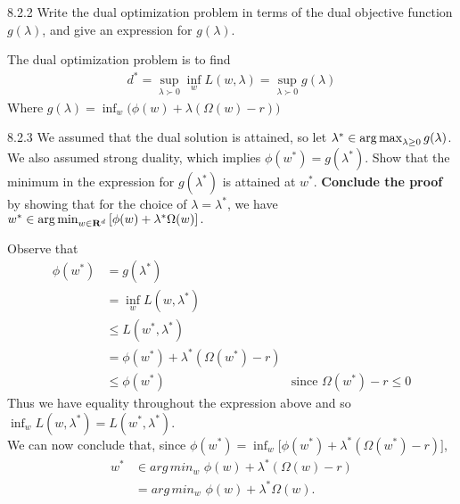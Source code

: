 \documentclass[12pt,letterpaper]{article}
\begin{document}
\begin{problem}{8.2.2}
Write the dual optimization problem in terms of the
dual objective function $g(\lambda)$, and give an expression for
$g(\lambda)$.
\end{problem}
\begin{solution}{}
    The dual optimization problem is to find
    \begin{align*}
        d^*= \sup_{\lambda\succ 0} \inf_w L(w,\lambda) = \sup_{\lambda\succ 0} g(\lambda)
    \end{align*}
    Where $g(\lambda) = \inf_w\big(\phi(w)+\lambda(\Omega(w)-r)\big)$
\end{solution}
\newpage

\begin{problem}{8.2.3}
We assumed that the dual solution is attained, so let
$\lambda^{*}\in\argmax_{\lambda\ge0}g(\lambda)$. We also assumed
strong duality, which implies $\phi(w^{*})=g(\lambda^{*})$. Show
that the minimum in the expression for $g(\lambda^{*})$ is attained
at $w^{*}$.
\textbf{Conclude the proof} by showing that for the choice of $\lambda=\lambda^{*}$,
we have $w^{*}\in\argmin_{w\in\reals^{d}}\left[\phi(w)+\lambda^{*}\Omega(w)\right].$
\end{problem}
\begin{solution}{}
    Observe that
    \begin{align*}
        \phi(w^*) &= g(\lambda^*)\\
        &= \inf_w L(w,\lambda^*)\\
        &\leq  L(w^*,\lambda^*)\\
        &= \phi(w^*) + \lambda^*(\Omega(w^*) - r)\\
        &\leq \phi(w^*) & \text{since $\Omega(w^*)-r\leq0$}
    \end{align*}
    Thus we have equality throughout the expression above and so $\inf_w L(w,\lambda^*) = L(w^*,\lambda^*)$.\\
    We can now conclude that, since $\phi(w^*) = \inf_w \big[\phi(w^*) + \lambda^*(\Omega(w^*) - r)\big]$,
    \begin{align*}
        w^* &\in arg\,min_w\,\, \phi(w) + \lambda^*(\Omega(w)-r)\\
        &= arg\,min_w\,\, \phi(w) + \lambda^*\Omega(w).
    \end{align*}
\end{solution}
\newpage
\end{document}
